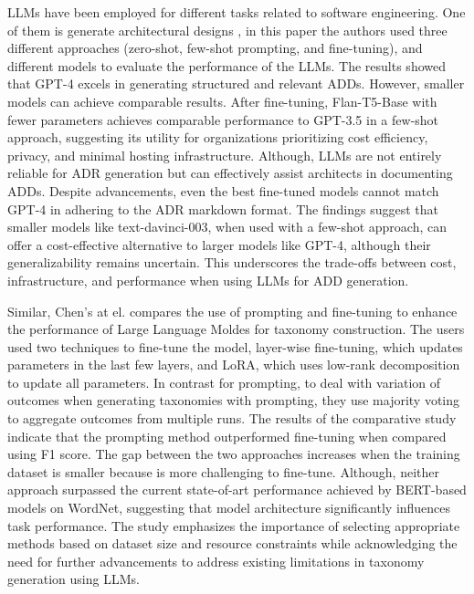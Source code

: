 LLMs have been employed for different tasks related to software engineering. One of them is generate architectural designs \cite{17Dhar}, in this paper the authors used three different approaches (zero-shot, few-shot prompting, and fine-tuning), and different models to evaluate the performance of the LLMs. The results showed that GPT-4 excels in generating structured and relevant ADDs. However, smaller models can achieve comparable results. After fine-tuning, Flan-T5-Base with fewer parameters achieves comparable performance to GPT-3.5 in a few-shot approach, suggesting its utility for organizations prioritizing cost efficiency, privacy, and minimal hosting infrastructure. Although, LLMs are not entirely reliable for ADR generation but can effectively assist architects in documenting ADDs. Despite advancements, even the best fine-tuned models cannot match GPT-4 in adhering to the ADR markdown format. The findings suggest that smaller models like text-davinci-003, when used with a few-shot approach, can offer a cost-effective alternative to larger models like GPT-4, although their generalizability remains uncertain. This underscores the trade-offs between cost, infrastructure, and performance when using LLMs for ADD generation.

Similar, Chen's at el. \cite{18Chen} compares the use of prompting and fine-tuning to enhance the performance of Large Language Moldes for taxonomy construction. The users used two techniques to fine-tune the model, layer-wise fine-tuning, which updates parameters in the last few layers, and LoRA, which uses low-rank decomposition to update all parameters. In contrast for prompting, to deal with variation of outcomes when generating taxonomies with prompting, they use majority voting to aggregate outcomes from multiple runs. The results of the comparative study indicate that the prompting method outperformed fine-tuning when compared using F1 score. The gap between the two approaches increases when the training dataset is smaller because is more challenging to fine-tune. Although, neither approach surpassed the current state-of-art performance achieved by BERT-based models on WordNet, suggesting that model architecture significantly influences task performance.
The study emphasizes the importance of selecting appropriate methods based on dataset size and resource constraints while acknowledging the need for further advancements to address existing limitations in taxonomy generation using LLMs.


